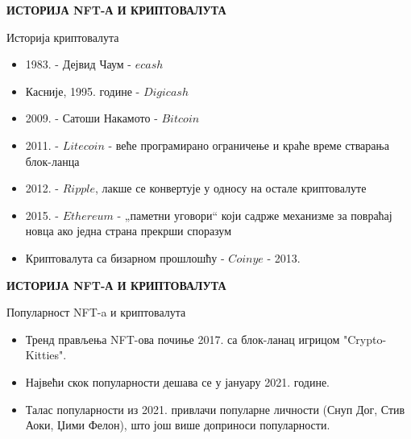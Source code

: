 \documentclass{beamer}
\begin{document}
\begin{frame}
{\large\textbf{ИСТОРИЈА NFT-А И КРИПТОВАЛУТА}}
\begin{center}
\textcolor[rgb]{0,0,0.55}{\colorbox[rgb]{0,0,1}{\textcolor[rgb]{1,1,1}{Историја криптовалута}}}
\end{center}
\begin{itemize}
\item 1983. - Дејвид Чаум - \(ecash\)
\item Касније, 1995. године - \(Digicash\) \cite{abrar1900untraceable}
\item 2009. - Сатоши Накамото - \(Bitcoin\) \cite{segendorf2014bitcoin}
\item 2011. - \(Litecoin\) - веће програмирано ограничење и краће време стварања блок-ланца
  \item 2012. - \(Ripple\), лакше се конвертује у односу на остале криптовалуте
  \item 2015. - \(Ethereum\) - „паметни уговори“ који садрже механизме за повраћај новца ако једна страна прекрши споразум
  \item Криптовалута са бизарном прошлошћу - \(Coinye\) - 2013.
  \end{itemize}

\end{frame}
\begin{frame}
{\large\textbf{ИСТОРИЈА NFT-А И КРИПТОВАЛУТА}}
\begin{center}
\textcolor[rgb]{0,0,0.55}{\colorbox[rgb]{0,0,1}{\textcolor[rgb]{1,1,1}{Популарност NFT-a и криптовалута}}}
\end{center}
 \begin{itemize}
     \item Тренд прављења NFT-ова почиње 2017. са блок-ланац игрицом "Crypto-Kitties".
\item Највећи скок популарности дешава се у јануару 2021. године.
\item Талас популарности из 2021. привлачи популарне личности (Снуп Дог, Стив Аоки, Џими Фелон), што још више доприноси популарности. \cite{ante2022non}
 \end{itemize}
\end{frame}
\end{document}

